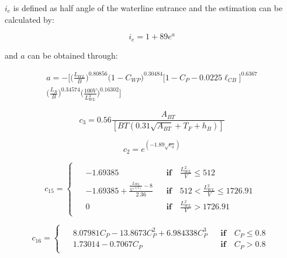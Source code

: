 $i_e$ is defined as half angle of the waterline entrance and the estimation can be calculated by:

\begin{equation}\label{eqn:i_e}
    i_e = 1+89 e^{a}
\end{equation}

and $a$ can be obtained through:

\begin{multline}\label{eqn:a_const_ie}
    a = -\biggl[ \biggl(\frac{L_{WL}}{B}\biggr)^{0.80856} \biggl(1 - C_{WP}\biggr)^{0.30484} \biggl[1 - C_P - 0.0225\ell_{CB}\biggr]^{0.6367} \\
    \biggl(\frac{L_R}{B}\biggr)^{0.34574} \biggl(\frac{100V}{L_{WL}^3}\biggr)^{0.16302} \biggr]
\end{multline}

\begin{equation}\label{eqn:c3}
    c_3 = 0.56 \frac{A_{BT}}{\left[BT\left(0.31 \sqrt{A_{BT}} + T_F + h_B\right)\right]}
\end{equation}

\begin{equation}\label{eqn:c2}
    c_2 = e^{(-1.89\sqrt{c_3})}
\end{equation}

\begin{equation}
    \label{eqn:c15}
    c_{15} =
    \begin{cases}
        \begin{aligned}
            & -1.69385 && \textbf{if} \quad \frac{L_{WL}^2}{V} \leqslant 512 \\
            & -1.69385 + \frac{\frac{L_{WL}}{V^{(1/3)}}-8}{2.36}&& \textbf{if} \quad 512 < \frac{L_{WL}^2}{V} \leqslant 1726.91 \\
            & 0 && \textbf{if} \quad \frac{L_{WL}^2}{V} > 1726.91
        \end{aligned}
    \end{cases}
\end{equation}

\begin{equation}
    \label{eqn:c16}
    c_{16} = 
    \begin{cases}
        \begin{aligned}
            & 8.07981C_P - 13.8673C_P^2 + 6.984338C_P^3 && \textbf{if} \quad C_P \leqslant 0.8 \\
            & 1.73014 - 0.7067C_P && \textbf{if} \quad C_P > 0.8
        \end{aligned}
    \end{cases}
\end{equation}

